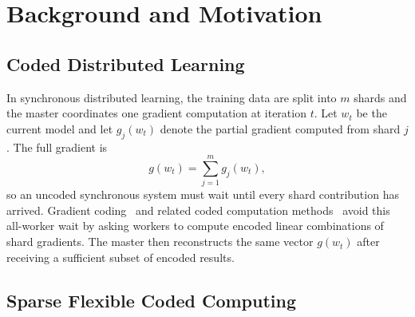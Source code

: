 \section{Background and Motivation}

\subsection{Coded Distributed Learning}

In synchronous distributed learning, the training data are split into
$m$ shards and the master coordinates one gradient computation at iteration
$t$.  Let $w_t$ be the current model and let $g_j(w_t)$ denote the partial
gradient computed from shard $j$.  The full gradient is
\begin{equation}
  \label{eq:full-gradient}
  g(w_t) = \sum_{j=1}^{m} g_j(w_t),
\end{equation}
so an uncoded synchronous system must wait until every shard contribution has
arrived.  Gradient coding~\cite{tandon2017gradient} and related coded
computation methods~\cite{lee2018speeding} avoid this all-worker wait by
asking workers to compute encoded linear combinations of shard gradients.  The
master then reconstructs the same vector $g(w_t)$ after receiving a sufficient
subset of encoded results.

\subsection{Sparse Flexible Coded Computing}

